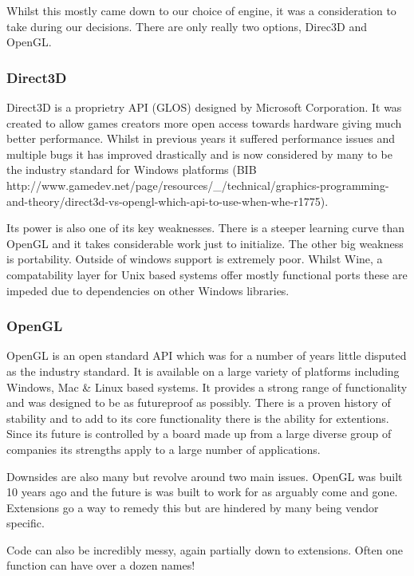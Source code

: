 Whilst this mostly came down to our choice of engine, it was a consideration
to take during our decisions. There are only really two options, Direc3D
and OpenGL.


\subsubsection*{Direct3D}

Direct3D is a proprietry API (GLOS) designed by Microsoft Corporation.
It was created to allow games creators more open access towards hardware
giving much better performance. Whilst in previous years it suffered
performance issues and multiple bugs it has improved drastically and
is now considered by many to be the industry standard for Windows
platforms (BIB http://www.gamedev.net/page/resources/\_/technical/graphics-programming-and-theory/direct3d-vs-opengl-which-api-to-use-when-whe-r1775).

Its power is also one of its key weaknesses. There is a steeper learning
curve than OpenGL and it takes considerable work just to initialize.
The other big weakness is portability. Outside of windows support
is extremely poor. Whilst Wine, a compatability layer for Unix based
systems offer mostly functional ports these are impeded due to dependencies
on other Windows libraries.


\subsubsection*{OpenGL}

OpenGL is an open standard API which was for a number of years little
disputed as the industry standard. It is available on a large variety
of platforms including Windows, Mac \& Linux based systems. It provides
a strong range of functionality and was designed to be as futureproof
as possibly. There is a proven history of stability and to add to
its core functionality there is the ability for extentions. Since
its future is controlled by a board made up from a large diverse group
of companies its strengths apply to a large number of applications.

Downsides are also many but revolve around two main issues. OpenGL
was built 10 years ago and the future is was built to work for as
arguably come and gone. Extensions go a way to remedy this but are
hindered by many being vendor specific.

Code can also be incredibly messy, again partially down to extensions.
Often one function can have over a dozen names!


